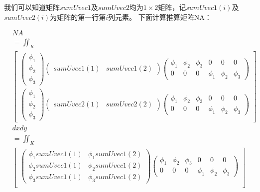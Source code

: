 \documentclass{ctexart}
\begin{document}
我们可以知道矩阵$sumUvec1$及$sumUvec2$均为$1\times 2$矩阵，记$sumUvec1(i)$及$sumUvec2(i)$为矩阵的第一行第$i$列元素。
下面计算推算矩阵NA：

\begin{align*}
    & NA\\
    & = \iint_K \\
    &
    \begin{bmatrix}
    \begin{pmatrix}
     \phi_1\\
     \phi_2\\
     \phi_3
    \end{pmatrix}
    \begin{pmatrix}
      sumUvec1(1)&sumUvec1(2)
    \end{pmatrix}
    \begin{pmatrix}
      \phi_1& \phi_2 & \phi_3 & 0 & 0 & 0\\
      0&  0& 0 & \phi_1 & \phi_2 & \phi_3
    \end{pmatrix}
     \\
    \begin{pmatrix}
     \phi_1\\
     \phi_2\\
     \phi_3
    \end{pmatrix}
    \begin{pmatrix}
      sumUvec2(1)&sumUvec2(2)
    \end{pmatrix}
    \begin{pmatrix}
      \phi_1& \phi_2 & \phi_3 & 0 & 0 & 0\\
      0&  0& 0 & \phi_1 & \phi_2 & \phi_3
    \end{pmatrix} 
    \end{bmatrix}\\
    & dxdy \\
    & = \iint_K \\
    &
    \begin{bmatrix}
    \begin{pmatrix}
      \phi_1 sumUvec1(1)&  \phi_1 sumUvec1(2)\\
      \phi_2 sumUvec1(1)&  \phi_2 sumUvec1(2) \\
      \phi_3 sumUvec1(1)&  \phi_3 sumUvec1(2)
    \end{pmatrix}
    \begin{pmatrix}
      \phi_1& \phi_2 & \phi_3 & 0 & 0 & 0\\
      0&  0& 0 & \phi_1 & \phi_2 & \phi_3
    \end{pmatrix}   
    \\

\end{bmatrix}
\end{align*}
\end{document}
